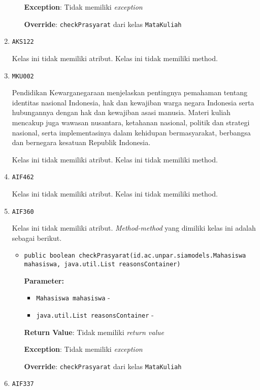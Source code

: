 \documentclass{article}
\begin{document}
\begin{enumerate}
\begin{itemize}
\textbf{Exception}: Tidak memiliki \textit{exception}

\textbf{Override}: \texttt{checkPrasyarat} dari kelas \texttt{MataKuliah}

\end{itemize}
\item \texttt{AKS122}



Kelas ini tidak memiliki atribut. Kelas ini tidak memiliki method. \item \texttt{MKU002}

Pendidikan Kewarganegaraan menjelaskan pentingnya pemahaman tentang identitas nasional 
 Indonesia, hak dan kewajiban warga negara Indonesia serta hubungannya dengan hak dan 
 kewajiban asasi manusia. Materi kuliah mencakup juga wawasan nusantara, ketahanan nasional, 
 politik dan strategi nasional, serta implementasinya dalam kehidupan bermasyarakat, berbangsa 
 dan bernegara kesatuan Republik Indonesia.

Kelas ini tidak memiliki atribut. Kelas ini tidak memiliki method. \item \texttt{AIF462}



Kelas ini tidak memiliki atribut. Kelas ini tidak memiliki method. \item \texttt{AIF360}



Kelas ini tidak memiliki atribut. \textit{Method-method} yang dimiliki kelas ini adalah sebagai berikut.
\begin{itemize}
\item \texttt{public boolean checkPrasyarat(id.ac.unpar.siamodels.Mahasiswa mahasiswa, java.util.List reasonsContainer)}

\textbf{Parameter:}
\begin{itemize}
\item \texttt{Mahasiswa mahasiswa} - 
\item \texttt{java.util.List reasonsContainer} - 
\end{itemize}
\textbf{Return Value}: Tidak memiliki \textit{return value}

\textbf{Exception}: Tidak memiliki \textit{exception}

\textbf{Override}: \texttt{checkPrasyarat} dari kelas \texttt{MataKuliah}

\end{itemize}
\item \texttt{AIF337}




\end{enumerate}
\end{document}
